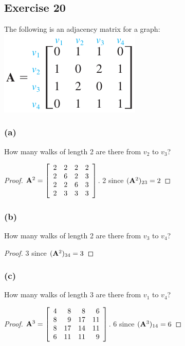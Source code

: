\documentclass[14pt]{extarticle}
\begin{document}
\subsection{Exercise 20}
The following is an adjacency matrix for a graph: \includegraphics[scale=0.4]{../images/10.2.20.png}

\subsubsection{(a)}
How many walks of length 2 are there from \(v_2\) to \(v_3\)?
\begin{proof}
\({\bf A}^2 = 
\left[ 
\begin{array}{rrrr}
2 & 2 & 2 & 2 \\
2 & 6 & 2 & 3 \\
2 & 2 & 6 & 3 \\
2 & 3 & 3 & 3 \\
\end{array}
\right]
\). 2 since \(({\bf A}^2)_{23} = 2\)
\end{proof}

\subsubsection{(b)}
How many walks of length 2 are there from \(v_3\) to \(v_4\)?
\begin{proof}
3 since \(({\bf A}^2)_{34} = 3\)
\end{proof}

\subsubsection{(c)}
How many walks of length 3 are there from \(v_1\) to \(v_4\)?
\begin{proof}
\({\bf A}^3 = 
\left[ 
\begin{array}{rrrr}
4 & 8 & 8 & 6 \\
8 & 9 & 17 & 11 \\
8 & 17 & 14 & 11 \\
6 & 11 & 11 & 9 \\
\end{array}
\right]
\). 6 since \(({\bf A}^3)_{14} = 6\)
\end{proof}
\end{document}

